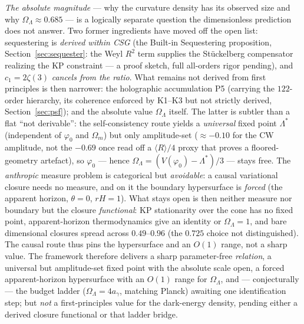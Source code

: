 \documentclass[11pt,a4paper]{article}
\theoremstyle{plain}
\theoremstyle{definition}
\theoremstyle{remark}
\newcommand{\OL}{\Omega_\Lambda}
\newcommand{\ag}{a_\gamma}
\begin{document}
\emph{The absolute magnitude} --- why the curvature density has its
observed size and why $\OL \approx 0.685$ --- is a logically separate question the
dimensionless prediction does not answer. Two former ingredients have moved off the open list:
sequestering is \emph{derived within CSG} (the Built-in Sequestering
proposition, Section~\ref{sec:sequester}: the Weyl $R^2$ term supplies the
Stückelberg compensator realizing the KP constraint --- a proof sketch, full all-orders
rigor pending), and $c_1 = 2\zeta(3)$ \emph{cancels from the ratio}. What remains not derived from first principles is then narrower: the
holographic accumulation P5 (carrying the $122$-order hierarchy, its coherence
enforced by K1--K3 but not strictly derived, Section~\ref{sec:psf}); and the absolute value $\OL$
itself. The latter is subtler than a flat ``not derivable'': the self-consistency route yields a
\emph{universal} fixed point $\Lambda^*$ (independent of $\varphi_0$ and $\Omega_m$) but only
amplitude-set ($\approx-0.10$ for the CW amplitude, not the $-0.69$ once read off a
$\langle R\rangle/4$ proxy that proves a floored-geometry artefact), so $\varphi_0$ --- hence
$\OL = (V(\varphi_0)-\Lambda^*)/3$ --- stays free.
The \emph{anthropic} measure problem is categorical but \emph{avoidable}: a causal variational closure needs no measure, and on
it the boundary hypersurface is \emph{forced} (the apparent horizon, $\theta=0$, $rH=1$). What stays open is then neither measure nor boundary but the
closure \emph{functional}: KP stationarity over the
cone has no fixed point, apparent-horizon thermodynamics
give an identity or $\OL=1$, and bare dimensional closures spread across $0.49$--$0.96$ (the
$0.725$ choice not distinguished). The causal route thus
pins the hypersurface and an $O(1)$ range, not a sharp value. The framework therefore delivers a sharp
parameter-free \emph{relation}, a universal but amplitude-set
fixed point with the absolute scale open, a forced apparent-horizon
hypersurface with an $O(1)$ range for $\OL$, and --- conjecturally --- the budget ladder
($\OL = 4\ag$, matching Planck) awaiting one identification step; but \emph{not} a first-principles
value for the dark-energy density, pending either a derived closure
functional or that ladder bridge.
\end{document}
